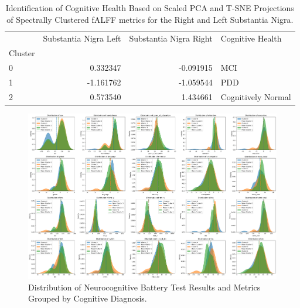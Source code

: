 \documentclass[12pt]{article}
\begin{document}
\FloatBarrier  %


\begin{table}[ht]
\centering
\begin{tabular}{lrrl}
    \toprule
     & Substantia Nigra Left & Substantia Nigra Right & Cognitive Health \\
    Cluster &  &  &  \\
    \midrule
    0 & 0.332347 & -0.091915 & MCI \\
    1 & -1.161762 & -1.059544 & PDD \\
    2 & 0.573540 & 1.434661 & Cognitively Normal \\
    \bottomrule
\end{tabular}
\caption{Identification of Cognitive Health Based on Scaled PCA and T-SNE Projections of Spectrally Clustered fALFF metrics for the Right and Left Substantia Nigra.}
\label{tab:example}  %
\end{table}


\FloatBarrier  %

\begin{figure}[h]  %
    \centering
    \includegraphics[width=\textwidth]{"../img/pdf_of_clustered_test_results.png"}  %
    \caption{Distribution of Neurocognitive Battery Test Results and Metrics Grouped by Cognitive Diagnosis.}
    \label{fig:pdf}  %
\end{figure}
\end{document}
